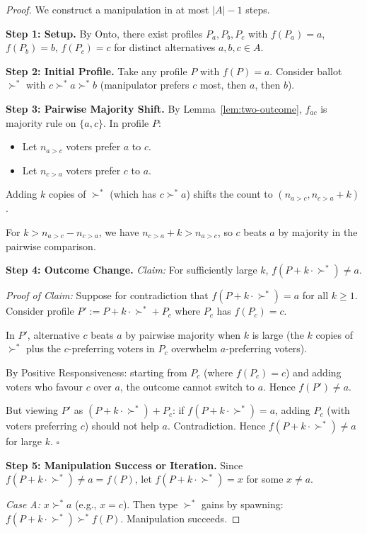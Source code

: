 \documentclass[12pt]{article}
\begin{document}
\begin{proof}
We construct a manipulation in at most $|A| - 1$ steps.

\textbf{Step 1: Setup.}
By Onto, there exist profiles $P_a, P_b, P_c$ with $f(P_a) = a$, $f(P_b) = b$, $f(P_c) = c$ for distinct alternatives $a, b, c \in A$.

\textbf{Step 2: Initial Profile.}
Take any profile $P$ with $f(P) = a$. Consider ballot $\succ^*$ with $c \succ^* a \succ^* b$ (manipulator prefers $c$ most, then $a$, then $b$).

\textbf{Step 3: Pairwise Majority Shift.}
By Lemma~\ref{lem:two-outcome}, $f_{ac}$ is majority rule on $\{a, c\}$. In profile $P$:
\begin{itemize}
    \item Let $n_{a > c}$ voters prefer $a$ to $c$.
    \item Let $n_{c > a}$ voters prefer $c$ to $a$.
\end{itemize}
Adding $k$ copies of $\succ^*$ (which has $c \succ^* a$) shifts the count to $(n_{a > c}, n_{c > a} + k)$.

For $k > n_{a > c} - n_{c > a}$, we have $n_{c > a} + k > n_{a > c}$, so $c$ beats $a$ by majority in the pairwise comparison.

\textbf{Step 4: Outcome Change.}
\textit{Claim:} For sufficiently large $k$, $f(P + k \cdot \succ^*) \neq a$.

\textit{Proof of Claim:} Suppose for contradiction that $f(P + k \cdot \succ^*) = a$ for all $k \geq 1$. Consider profile $P' := P + k \cdot \succ^* + P_c$ where $P_c$ has $f(P_c) = c$.

In $P'$, alternative $c$ beats $a$ by pairwise majority when $k$ is large (the $k$ copies of $\succ^*$ plus the $c$-preferring voters in $P_c$ overwhelm $a$-preferring voters).

By Positive Responsiveness: starting from $P_c$ (where $f(P_c) = c$) and adding voters who favour $c$ over $a$, the outcome cannot switch to $a$. Hence $f(P') \neq a$.

But viewing $P'$ as $(P + k \cdot \succ^*) + P_c$: if $f(P + k \cdot \succ^*) = a$, adding $P_c$ (with voters preferring $c$) should not help $a$. Contradiction. Hence $f(P + k \cdot \succ^*) \neq a$ for large $k$. $\square$

\textbf{Step 5: Manipulation Success or Iteration.}
Since $f(P + k \cdot \succ^*) \neq a = f(P)$, let $f(P + k \cdot \succ^*) = x$ for some $x \neq a$.

\textit{Case A:} $x \succ^* a$ (e.g., $x = c$). Then type $\succ^*$ gains by spawning: $f(P + k \cdot \succ^*) \succ^* f(P)$. Manipulation succeeds.


\end{proof}
\end{document}
